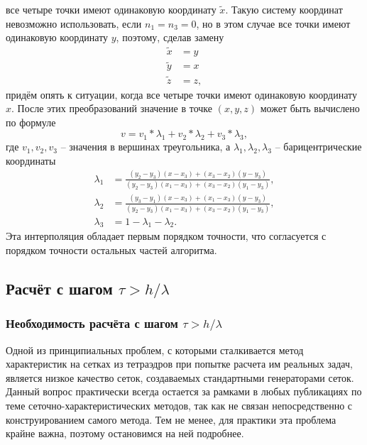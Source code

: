 все четыре точки имеют одинаковую координату $\tilde{x}$. Такую систему
координат невозможно использовать, если $n_1=n_3=0$, но в этом случае все точки
имеют одинаковую координату $y$, поэтому, сделав замену
\begin{align}
\label{eq:new_coords_2}
\tilde{x}&=y \nonumber\\
\tilde{y}&=x \nonumber \\
\tilde{z}&=z,
\end{align}
придём опять к ситуации, когда все четыре точки имеют одинаковую координату $x$.
После этих преобразований значение в точке $(x,y,z)$ может быть вычислено по формуле
\begin{equation}
\label{eq:triangle_interpolation}
v=v_1*\lambda_1+v_2*\lambda_2+v_3*\lambda_3, 
\end{equation}
где $v_1,v_2,v_3$ -- значения в вершинах треугольника, а $\lambda_1,\lambda_2,\lambda_3$ -- барицентрические координаты
\begin{align}
\label{eq:barycentric_coords}
\lambda_1&=\frac{(y_2-y_3)(x-x_3)+(x_3-x_2)(y-y_3)}{(y_2-y_3)(x_1-x_3)+(x_3-x_2)(y_1-y_3)}, \nonumber \\
\lambda_2&=\frac{(y_3-y_1)(x-x_3)+(x_1-x_3)(y-y_3)}{(y_2-y_3)(x_1-x_3)+(x_3-x_2)(y_1-y_3)}, \nonumber \\
\lambda_3&=1-\lambda_1-\lambda_2.
\end{align}
Эта интерполяция обладает первым порядком точности, что согласуется с порядком точности остальных частей алгоритма.


\clearpage
\newpage


\subsection{Расчёт с шагом $\tau > h/\lambda$}

\subsubsection{Необходимость расчёта с шагом $\tau > h/\lambda$}

Одной из принципиальных проблем, с которыми сталкивается метод характеристик на сетках из тетраэдров при попытке расчета им реальных задач, является низкое качество сеток, создаваемых стандартными генераторами сеток. Данный вопрос практически всегда остается за рамками в любых публикациях по теме сеточно-характеристических методов, так как не связан непосредственно с конструированием самого метода. Тем не менее, для практики эта проблема крайне важна, поэтому остановимся на ней подробнее.

